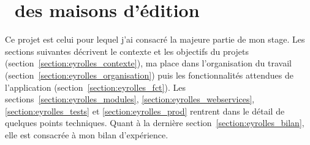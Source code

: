 \section{\aintranet\ des maisons d'édition \aey}

Ce projet est celui pour lequel j'ai consacré la majeure partie de mon stage. Les sections suivantes décrivent le contexte et les objectifs du projets (section~\ref{section:eyrolles_contexte}), ma place dans l'organisation du travail (section~\ref{section:eyrolles_organisation}) puis les fonctionnalités attendues de l'application (section~\ref{section:eyrolles_fct}). Les sections~\ref{section:eyrolles_modules}, \ref{section:eyrolles_webservices}, \ref{section:eyrolles_tests} et \ref{section:eyrolles_prod} rentrent dans le détail de quelques points techniques. Quant à la dernière section~\ref{section:eyrolles_bilan}, elle est consacrée à mon bilan d'expérience.

















